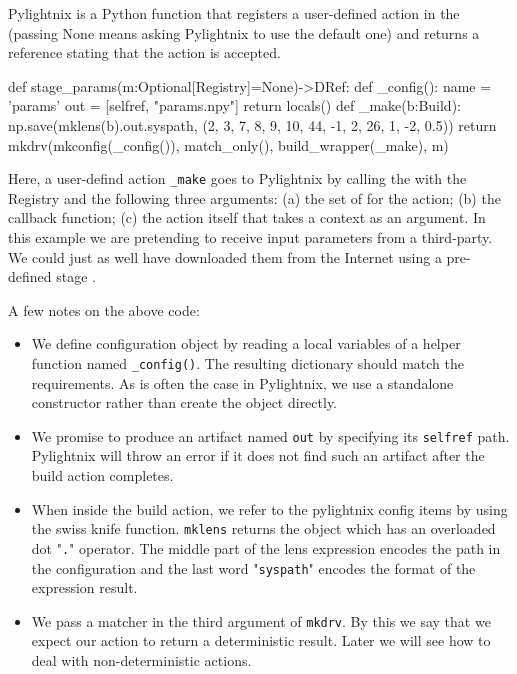 Pylightnix  is a Python function that
registers a user-defined action in the 
(passing None means asking Pylightnix to use the default one) and returns a
 reference stating that the action is
accepted.

\begin{pythontexcode}
def stage_params(m:Optional[Registry]=None)->DRef:
  def _config():
    name = 'params'
    out = [selfref, "params.npy"]
    return locals()
  def _make(b:Build):
    np.save(mklens(b).out.syspath, (2, 3, 7, 8, 9, 10, 44, -1, 2, 26, 1, -2, 0.5))
  return mkdrv(mkconfig(_config()), match_only(), build_wrapper(_make), m)
\end{pythontexcode}

Here, a user-defind action \texttt{\_make} goes to Pylightnix by calling the
 with the Registry and the following three
arguments: (a) the set of  for the
action; (b) the  callback function; (c)
the action itself that takes a  context as
an argument. In this example we are pretending to receive input parameters from
a third-party. We could just as well have downloaded them from the Internet using
a pre-defined stage .

\hfill \break \noindent
A few notes on the above code:

\begin{itemize}
  \item We define configuration object by reading a local variables of a helper
    function named \texttt{\_config()}. The resulting dictionary should match
    the  requirements. As is often the
    case in Pylightnix, we use a standalone
     constructor rather than create the
    object directly.
  \item We promise to produce an artifact named \texttt{out} by specifying its
    \texttt{selfref} path. Pylightnix will throw an error if it does not find
    such an artifact after the build action completes.
  \item When inside the build action, we refer to the pylightnix config items by
    using the  swiss knife function.
    \texttt{mklens} returns the  object which
    has an overloaded dot "\texttt{.}" operator. The middle part of the lens
    expression encodes the path in the configuration and the last word
    "\texttt{syspath}" encodes the format of the expression result.
  \item We pass a  matcher in
    the third argument of \texttt{mkdrv}. By this we say that we expect our
    action to return a deterministic result. Later we will see how to deal with
    non-deterministic actions.
  \end{itemize}

